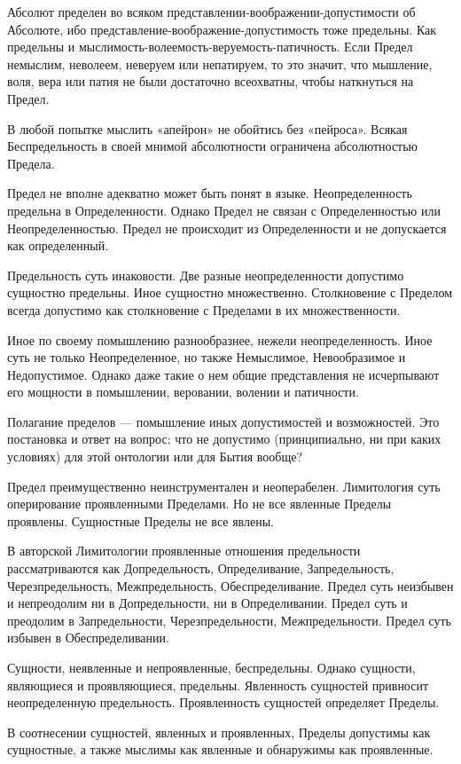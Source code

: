 Абсолют пределен во всяком представлении-воображении-допустимости об Абсолюте,
ибо представление\hyp воображение\hyp допустимость тоже предельны. Как предельны и
мыслимость\hyp волеемость\hyp веруемость\hyp патичность. Если Предел немыслим, неволеем,
неверуем или непатируем, то это значит, что мышление, воля, вера или патия не
были достаточно всеохватны, чтобы наткнуться на Предел.

В любой попытке мыслить «апейрон» не обойтись без «пейроса». Всякая
Беспредельность в своей мнимой абсолютности ограничена абсолютностью Предела.

Предел не вполне адекватно может быть понят в языке. Неопределенность предельна
в Определенности. Однако Предел не связан с Определенностью или
Неопределенностью. Предел не происходит из Определенности и не допускается как
определенный.

Предельность суть инаковости. Две разные неопределенности допустимо сущностно
предельны. Иное сущностно множественно. Столкновение с Пределом всегда
допустимо как столкновение с Пределами в их множественности.

Иное по своему помышлению разнообразнее, нежели неопределенность. Иное суть не
только Неопределенное, но также Немыслимое, Невообразимое и Недопустимое.
Однако даже такие о нем общие представления не исчерпывают его мощности в
помышлении, веровании, волении и патичности.

Полагание пределов — помышление иных допустимостей и возможностей. Это
постановка и ответ на вопрос: что не допустимо (принципиально, ни при каких
условиях) для этой онтологии или для Бытия вообще?

Предел преимущественно неинструментален и неоперабелен. Лимитология суть
оперирование проявленными Пределами. Но не все явленные Пределы проявлены.
Сущностные Пределы не все явлены.

В авторской Лимитологии проявленные отношения предельности рассматриваются как
Допредельность, Определивание, Запредельность, Черезпредельность,
Межпредельность, Обеспределивание. Предел суть неизбывен и непреодолим ни в
Допредельности, ни в Определивании. Предел суть и преодолим в Запредельности,
Черезпредельности, Межпредельности. Предел суть избывен в Обеспределивании.

Сущности, неявленные и непроявленные, беспредельны. Однако сущности, являющиеся
и проявляющиеся, предельны. Явленность сущностей привносит неопределенную
предельность. Проявленность сущностей определяет Пределы.

В соотнесении сущностей, явленных и проявленных, Пределы допустимы как
сущностные, а также мыслимы как явленные и обнаружимы как проявленные.


